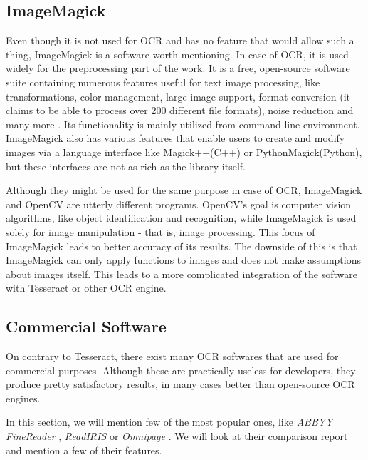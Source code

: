 \subsection{ImageMagick}

Even though it is not used for OCR and has no feature that would allow such a thing, ImageMagick is a software worth mentioning. In case of OCR, it is used widely for the preprocessing part of the work. It is a free, open-source software suite containing numerous features useful for text image processing, like transformations, color management, large image support, format conversion (it claims to be able to process over 200 different file formats), noise reduction and many more \citep{ImageMagick}. Its functionality is mainly utilized from command-line environment. ImageMagick also has various features that enable users to create and modify images via a language interface like Magick++(C++) or PythonMagick(Python), but these interfaces are not as rich as the library itself. 

Although they might be used for the same purpose in case of OCR, ImageMagick and OpenCV are utterly different programs. OpenCV's goal is computer vision algorithms, like object identification and recognition, while ImageMagick is used solely for image manipulation - that is, image processing. This focus of ImageMagick leads to better accuracy of its results. The downside of this is that ImageMagick can only apply functions to images and does not make assumptions about images itself. This leads to a more complicated integration of the software with Tesseract or other OCR engine.

\subsection{Commercial Software}

On contrary to Tesseract, there exist many OCR softwares that are used for commercial purposes. Although these are practically useless for developers, they produce pretty satisfactory results, in many cases better than open-source OCR engines.

In this section, we will mention few of the most popular ones, like \emph{ABBYY FineReader} \citep{Finereader}, \emph{ReadIRIS} \citep{ReadIris} or \emph{Omnipage} \citep{Omnipage}. We will look at their comparison report and mention a few of their features.

